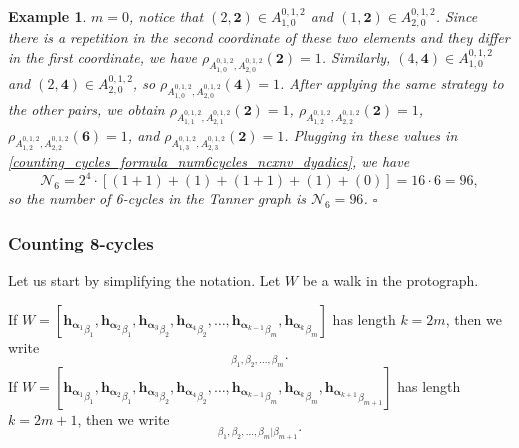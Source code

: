 \documentclass[11pt]{article}
\theoremstyle{plain}
\theoremstyle{plain}
\newtheorem{PreExample}[lemma]{{\textbf{Example}}}
\newenvironment{example}%
    {\begin{PreExample}\upshape}{\hfill$\square$\end{PreExample}}
\theoremstyle{definition}
\numberwithin{theo}{section}
\newcommand{\bh}{{\mathbf h}}
\newcommand{\balpha}{{\boldsymbol \alpha}}
\newcounter{alp}
\begin{document}
\begin{example}
$m=0$, notice that $(2,\mathbf{2})\in A_{1,0}^{0,1,2}$ and $(1,\mathbf{2})\in A_{2,0}^{0,1,2}$. Since there is a repetition in the second coordinate of these two elements and they differ in the first coordinate, we have $\rho_{A_{1,0}^{0,1,2},A_{2,0}^{0,1,2}}(\mathbf{2})=1$. Similarly, $(4,\mathbf{4})\in A_{1,0}^{0,1,2}$ and $(2,\mathbf{4})\in A_{2,0}^{0,1,2}$, so $\rho_{A_{1,0}^{0,1,2},A_{2,0}^{0,1,2}}(\mathbf{4})=1$.
After applying the same strategy to the other pairs, we obtain $\rho_{A_{1,1}^{0,1,2},A_{2,1}^{0,1,2}}(\mathbf{2})=1$, $\rho_{A_{1,2}^{0,1,2},A_{2,2}^{0,1,2}}(\mathbf{2})=1$, $\rho_{A_{1,2}^{0,1,2},A_{2,2}^{0,1,2}}(\mathbf{6})=1$, and $\rho_{A_{1,3}^{0,1,2},A_{2,3}^{0,1,2}}(\mathbf{2})=1$. Plugging in these values in \eqref{counting_cycles_formula_num6cycles_ncxnv_dyadics}, we have
\begin{equation*}
\mathcal{N}_6=2^4\cdot\left[(1+1)+(1)+(1+1)+(1)+(0)\right] = 16\cdot6 = 96,
\end{equation*}
so the number of 6-cycles in the Tanner graph is $\mathcal{N}_6=96$.
\end{example}

\subsubsection{Counting 8-cycles}
\label{counting_cycles_counting_8cycles_dyadics}

Let us start by simplifying the notation. Let $W$ be a walk in the protograph. 

\noindent If $W=[{\bh_{\balpha_1}}_{\beta_1},{\bh_{\balpha_2}}_{\beta_1},{\bh_{\balpha_3}}_{\beta_2},{\bh_{\balpha_4}}_{\beta_2},\dots,{\bh_{\balpha_{k-1}}}_{\beta_m},{\bh_{\balpha_{k}}}_{\beta_m}]$ has length $k=2m$, then we write
\begin{equation*}
[{\bh_{\balpha_1}},{\bh_{\balpha_2}},\dots,{\bh_{\balpha_{k}}}]_{\beta_1,\beta_2,\dots,\beta_m}.    
\end{equation*} 
If $W=[{\bh_{\balpha_1}}_{\beta_1},{\bh_{\balpha_2}}_{\beta_1},{\bh_{\balpha_3}}_{\beta_2},{\bh_{\balpha_4}}_{\beta_2},\dots,{\bh_{\balpha_{k-1}}}_{\beta_m},{\bh_{\balpha_{k}}}_{\beta_m},{\bh_{\balpha_{k+1}}}_{\beta_{m+1}}]$ has length $k=2m+1$, then we write 
\begin{equation*}
[{\bh_{\balpha_1}},{\bh_{\balpha_2}},\dots,{\bh_{\balpha_{k}}}|{\bh_{\balpha_{k+1}}}]_{\beta_1,\beta_2,\dots,\beta_m |\beta_{m+1}}.
\end{equation*}
\end{document}
